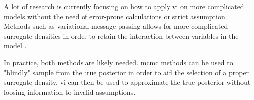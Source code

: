 A lot of research is currently focusing on how to apply \acrshort{vi} on more complicated models without the need of error-prone calculations or strict assumption. Methods such as variational message passing allows for more complicated surrogate densities in order to retain the interaction between variables in the model \cite{winnbishop}. 

In practice, both methods are likely needed. \acrshort{mcmc} methods can be used to "blindly" sample from the true posterior in order to aid the selection of a proper surrogate density. \acrshort{vi} can then be used to approximate the true posterior without loosing information to invalid assumptions. 

\section{}

